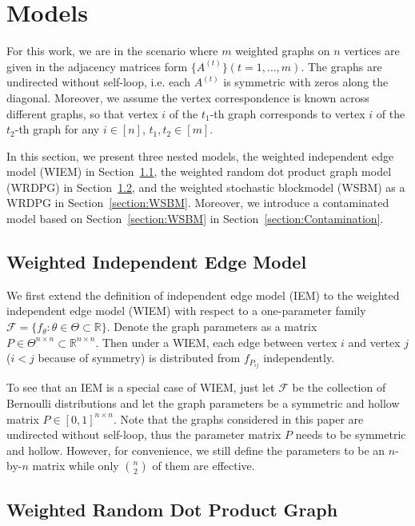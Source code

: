 \documentclass[a4paper]{article}
\begin{document}
\section{Models}
\label{section:model}

For this work, we are in the scenario where $m$ weighted graphs on $n$ vertices are given in the adjacency matrices form $\{ A^{(t)} \} (t = 1, \dotsc, m)$. The graphs are undirected without self-loop, i.e. each $A^{(t)}$ is symmetric with zeros along the diagonal. Moreover, we assume the vertex correspondence is known across different graphs, so that vertex $i$ of the $t_1$-th graph corresponds to vertex $i$ of the $t_2$-th graph for any $i \in [n]$, $t_1, t_2 \in [m]$.

In this section, we present three nested models, the weighted independent edge model (WIEM) in Section~\ref{section:WIEM}, the weighted random dot product graph model (WRDPG) in Section~\ref{section:WRDPG}, and the weighted stochastic blockmodel (WSBM) as a WRDPG in Section~\ref{section:WSBM}. Moreover, we introduce a contaminated model based on Section~\ref{section:WSBM} in Section~\ref{section:Contamination}.

\subsection{Weighted Independent Edge Model}
\label{section:WIEM}

We first extend the definition of independent edge model (IEM) \citep{bollobas2007phase} to the weighted independent edge model (WIEM) with respect to a one-parameter family $\mathcal{F} = \{ f_{\theta} : \theta \in \Theta \subset \mathbb{R} \}$. Denote the graph parameters as a matrix $P \in \Theta^{n \times n} \subset \mathbb{R}^{n \times n}$. Then under a WIEM, each edge between vertex $i$ and vertex $j$ ($i < j$ because of symmetry) is distributed from $f_{P_{ij}}$ independently.

To see that an IEM is a special case of WIEM, just let $\mathcal{F}$ be the collection of Bernoulli distributions and let the graph parameters be a symmetric and hollow matrix $P \in [0, 1]^{n \times n}$.
Note that the graphs considered in this paper are undirected without self-loop, thus the parameter matrix $P$ needs to be symmetric and hollow. However, for convenience, we still define the parameters to be an $n$-by-$n$ matrix while only $n \choose 2$ of them are effective.


\subsection{Weighted Random Dot Product Graph}
\label{section:WRDPG}
\end{document}
